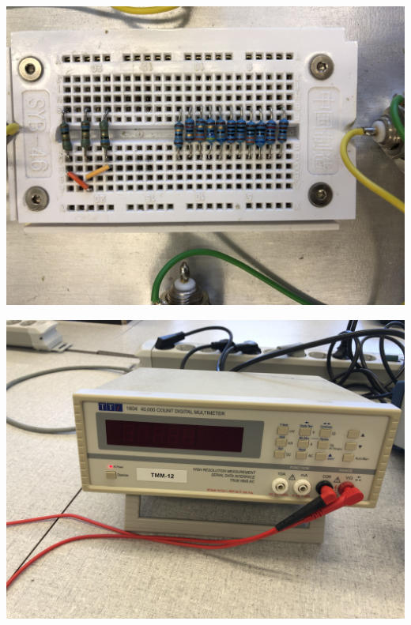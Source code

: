 \documentclass[11pt,ngerman]{scrartcl}
\begin{document}
\begin{minipage}{\textwidth}
	\begin{minipage}[t]{0.49\textwidth}
		\centering
		\includegraphics[angle =180,width=\textwidth]{widerst}
		\label{fig:widerst}
	\end{minipage}
	\vspace{2mm}
	\begin{minipage}[t]{0.49\textwidth}
		\centering
		\includegraphics[width=\textwidth]{multi}
		\label{fig:multi}
	\end{minipage}
	\vspace{1em}
\end{minipage}
\end{document}
